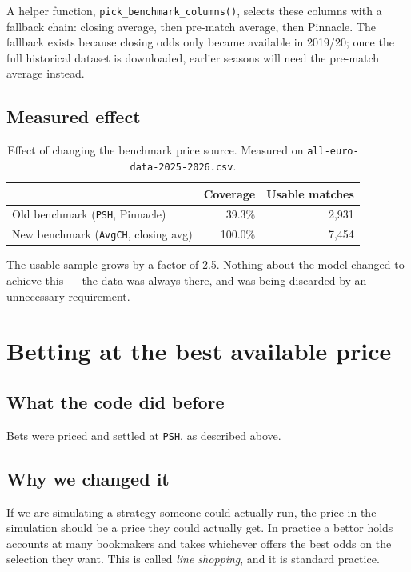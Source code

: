 \documentclass[11pt,a4paper]{article}
\newcommand{\code}[1]{\texttt{#1}}
\begin{document}
A helper function, \code{pick\_benchmark\_columns()}, selects these columns
with a fallback chain: closing average, then pre-match average, then
Pinnacle. The fallback exists because closing odds only became available in
2019/20; once the full historical dataset is downloaded, earlier seasons will
need the pre-match average instead.

\subsection{Measured effect}

\begin{table}[h]
\centering
\small
\begin{tabular}{@{}lrr@{}}
\toprule
& \textbf{Coverage} & \textbf{Usable matches} \\
\midrule
Old benchmark (\code{PSH}, Pinnacle)      & 39.3\%  & 2{,}931 \\
New benchmark (\code{AvgCH}, closing avg) & 100.0\% & 7{,}454 \\
\bottomrule
\end{tabular}
\caption{Effect of changing the benchmark price source. Measured on
\code{all-euro-data-2025-2026.csv}.}
\end{table}

The usable sample grows by a factor of 2.5. Nothing about the model changed
to achieve this --- the data was always there, and was being discarded by an
unnecessary requirement.

\section{Betting at the best available price}

\subsection{What the code did before}

Bets were priced and settled at \code{PSH}, as described above.

\subsection{Why we changed it}

If we are simulating a strategy someone could actually run, the price in the
simulation should be a price they could actually get. In practice a bettor
holds accounts at many bookmakers and takes whichever offers the best odds
on the selection they want. This is called \emph{line shopping}, and it is
standard practice.
\end{document}
